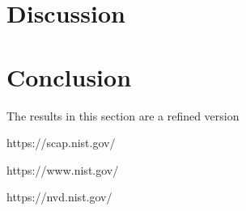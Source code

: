 \documentclass{llncs}
\begin{document}
\newpage
\section{Discussion}

\newpage
\section{Conclusion}
The results in this section are a refined version



\begin{thebibliography}{[MT1]}

%

https://scap.nist.gov/

https://www.nist.gov/

https://nvd.nist.gov/


%
\end{thebibliography}
\end{document}
